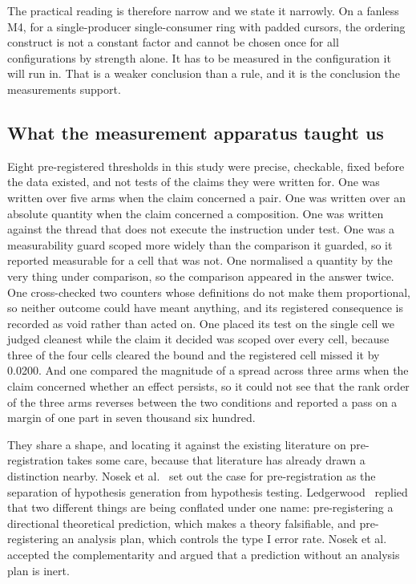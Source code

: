 \documentclass[conference]{IEEEtran}
\begin{document}
The practical reading is therefore narrow and we state it narrowly. On a
fanless M4, for a single-producer single-consumer ring with padded cursors, the
ordering construct is not a constant factor and cannot be chosen once for all
configurations by strength alone. It has to be measured in the configuration it
will run in. That is a weaker conclusion than a rule, and it is the conclusion
the measurements support.

\subsection{What the measurement apparatus taught us}

Eight pre-registered thresholds in this study were precise, checkable, fixed
before the data existed, and not tests of the claims they were written for. One
was written over five arms when the claim concerned a pair. One was written over
an absolute quantity when the claim concerned a composition. One was written
against the thread that does not execute the instruction under test. One was a
measurability guard scoped more widely than the comparison it guarded, so it
reported measurable for a cell that was not. One normalised a quantity by the
very thing under comparison, so the comparison appeared in the answer twice. One
cross-checked two counters whose definitions do not make them proportional, so
neither outcome could have meant anything, and its registered consequence is
recorded as void rather than acted on. One placed its test on the single
cell we judged cleanest while the claim it decided was scoped over every cell,
because three of the four cells cleared the bound and the registered cell
missed it by 0.0200. And one compared the magnitude of a spread across three
arms when the claim concerned whether an effect persists, so it could not see
that the rank order of the three arms reverses between the two conditions and
reported a pass on a margin of one part in seven thousand six hundred.

They share a shape, and locating it against the existing literature on
pre-registration takes some care, because that literature has already drawn a
distinction nearby. Nosek et al.~\cite{nosek2018preregistration} set out the
case for pre-registration as the separation of hypothesis generation from
hypothesis testing. Ledgerwood~\cite{ledgerwood2018distinguish} replied that two
different things are being conflated under one name: pre-registering a
directional theoretical prediction, which makes a theory falsifiable, and
pre-registering an analysis plan, which controls the type I error rate. Nosek et
al.~\cite{nosek2018reply} accepted the complementarity and argued that a
prediction without an analysis plan is inert.
\end{document}
